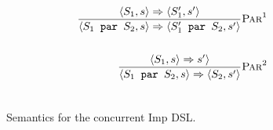 \begin{figure}[!htbp]
\begin{align*}
\frac{\langle S_1 , s \rangle \Rightarrow \langle S_1' , s' \rangle}
	 {\langle S_1 \texttt{ par } S_2, s \rangle \Rightarrow \langle S_1' \texttt{ par } S_2, s' \rangle}
	 \textsc{Par}^1 
\\
\\
\frac{\langle S_1 , s \rangle \Rightarrow s' \rangle}
     {\langle S_1 \texttt{ par } S_2, s \rangle \Rightarrow \langle S_2, s' \rangle}  
	 \textsc{Par}^2
\\
\\
\end{align*}
\caption{Semantics for the concurrent Imp DSL.
}
\label{fig:par-rules}
\end{figure}
